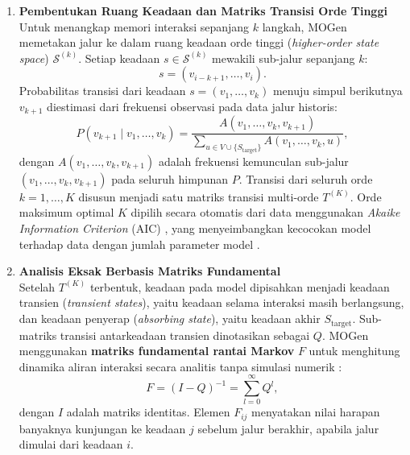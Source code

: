 \begin{enumerate}[label=\textbf{\arabic*.}, leftmargin=2.8em, itemsep=0.7em, parsep=0.25em]
    \item \textbf{Pembentukan Ruang Keadaan dan Matriks Transisi Orde Tinggi}\\
    Untuk menangkap memori interaksi sepanjang $k$ langkah, MOGen memetakan jalur ke dalam ruang keadaan orde tinggi (\textit{higher-order state space}) $\mathcal{S}^{(k)}$.
    Setiap keadaan $s \in \mathcal{S}^{(k)}$ mewakili sub-jalur sepanjang $k$:
    \begin{equation}
    s = (v_{i-k+1}, \ldots, v_i).
    \end{equation}
    Probabilitas transisi dari keadaan $s = (v_1, \ldots, v_k)$ menuju simpul berikutnya $v_{k+1}$ diestimasi dari frekuensi observasi pada data jalur historis:
    \begin{equation}
    P(v_{k+1} \mid v_1, \ldots, v_k)
    = \frac{A(v_1, \ldots, v_k, v_{k+1})}
    {\sum\limits_{u \in V \cup \{S_{\mathrm{target}}\}} A(v_1, \ldots, v_k, u)},
    \end{equation}
    dengan $A(v_1, \ldots, v_k, v_{k+1})$ adalah frekuensi kemunculan sub-jalur $(v_1, \ldots, v_k, v_{k+1})$ pada seluruh himpunan $P$.
    Transisi dari seluruh orde $k = 1, \ldots, K$ disusun menjadi satu matriks transisi multi-orde $T^{(K)}$.
    Orde maksimum optimal $K$ dipilih secara otomatis dari data menggunakan \textit{Akaike Information Criterion} (AIC) \parencite{akaike1974new}, yang menyeimbangkan kecocokan model terhadap data dengan jumlah parameter model \parencite{gote2023mogen}.

    \item \textbf{Analisis Eksak Berbasis Matriks Fundamental}\\
    Setelah $T^{(K)}$ terbentuk, keadaan pada model dipisahkan menjadi keadaan transien (\textit{transient states}), yaitu keadaan selama interaksi masih berlangsung, dan keadaan penyerap (\textit{absorbing state}), yaitu keadaan akhir $S_{\mathrm{target}}$.
    Sub-matriks transisi antarkeadaan transien dinotasikan sebagai $Q$.
    MOGen menggunakan \textbf{matriks fundamental rantai Markov} $F$ \parencite{kemeny1960finite} untuk menghitung dinamika aliran interaksi secara analitis tanpa simulasi numerik \parencite{gote2023locating}:
    \begin{equation}
    F = (I - Q)^{-1} = \sum_{l=0}^{\infty} Q^l,
    \end{equation}
    dengan $I$ adalah matriks identitas.
    Elemen $F_{ij}$ menyatakan nilai harapan banyaknya kunjungan ke keadaan $j$ sebelum jalur berakhir, apabila jalur dimulai dari keadaan $i$.
\end{enumerate}

